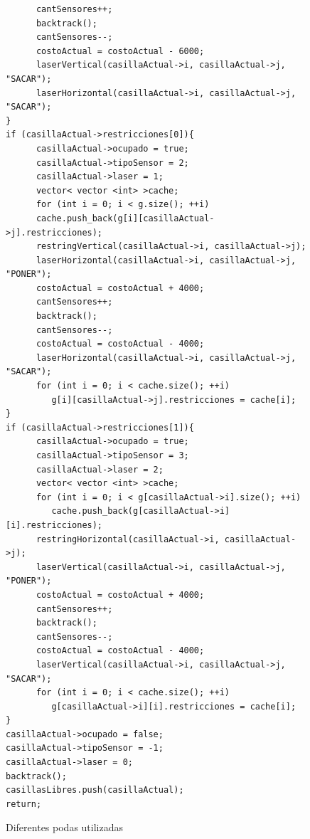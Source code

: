 \begin{figure}[H]
\begin{center}
\begin{verbatim}
      cantSensores++;
      backtrack();
      cantSensores--;
      costoActual = costoActual - 6000;
      laserVertical(casillaActual->i, casillaActual->j, "SACAR");
      laserHorizontal(casillaActual->i, casillaActual->j, "SACAR");
}
if (casillaActual->restricciones[0]){ 
      casillaActual->ocupado = true;
      casillaActual->tipoSensor = 2;
      casillaActual->laser = 1;
      vector< vector <int> >cache;
      for (int i = 0; i < g.size(); ++i)
      cache.push_back(g[i][casillaActual->j].restricciones);
      restringVertical(casillaActual->i, casillaActual->j);
      laserHorizontal(casillaActual->i, casillaActual->j, "PONER");
      costoActual = costoActual + 4000;
      cantSensores++;
      backtrack();
      cantSensores--;
      costoActual = costoActual - 4000;
      laserHorizontal(casillaActual->i, casillaActual->j, "SACAR");
      for (int i = 0; i < cache.size(); ++i)
         g[i][casillaActual->j].restricciones = cache[i];
}
if (casillaActual->restricciones[1]){ 
      casillaActual->ocupado = true;
      casillaActual->tipoSensor = 3;
      casillaActual->laser = 2;
      vector< vector <int> >cache;			
      for (int i = 0; i < g[casillaActual->i].size(); ++i)
         cache.push_back(g[casillaActual->i][i].restricciones);
      restringHorizontal(casillaActual->i, casillaActual->j);
      laserVertical(casillaActual->i, casillaActual->j, "PONER"); 
      costoActual = costoActual + 4000;
      cantSensores++;
      backtrack();
      cantSensores--;
      costoActual = costoActual - 4000;
      laserVertical(casillaActual->i, casillaActual->j, "SACAR");
      for (int i = 0; i < cache.size(); ++i)
         g[casillaActual->i][i].restricciones = cache[i];
}
casillaActual->ocupado = false;
casillaActual->tipoSensor = -1;
casillaActual->laser = 0;	
backtrack();
casillasLibres.push(casillaActual);
return;

\end{verbatim}
\caption{Diferentes podas utilizadas}
\end{center}
\end{figure}



